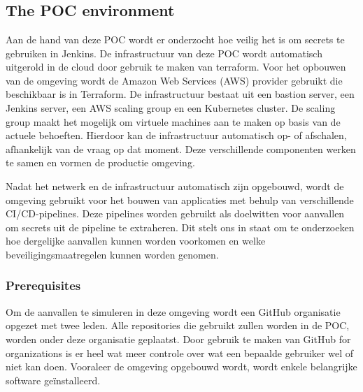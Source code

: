 
\chapter{}%
\label{ch:proof of concept}

\section{
{The POC environment}}
\label{sec:De POC omgeving}

Aan de hand van deze POC wordt er onderzocht hoe veilig het is om secrets te gebruiken in Jenkins. De infrastructuur van deze POC wordt automatisch uitgerold in de cloud door gebruik te maken van terraform. Voor het opbouwen van de omgeving wordt de Amazon Web Services (AWS) provider gebruikt die beschikbaar is in Terraform. De infrastructuur bestaat uit een bastion server, een Jenkins server, een AWS scaling group en een Kubernetes cluster. De scaling group maakt het mogelijk om virtuele machines aan te maken op basis van de actuele behoeften. Hierdoor kan de infrastructuur automatisch op- of afschalen, afhankelijk van de vraag op dat moment. Deze verschillende componenten werken te samen en vormen de productie omgeving.
\newline 

Nadat het netwerk en de infrastructuur automatisch zijn opgebouwd, wordt de omgeving gebruikt voor het bouwen van applicaties met behulp van verschillende CI/CD-pipelines. Deze pipelines worden gebruikt als doelwitten voor aanvallen om secrets uit de pipeline te extraheren. Dit stelt ons in staat om te onderzoeken hoe dergelijke aanvallen kunnen worden voorkomen en welke beveiligingsmaatregelen kunnen worden genomen.

\subsection{
{Prerequisites}}
\label{sec:Prerequisites}

Om de aanvallen te simuleren in deze omgeving wordt een GitHub organisatie opgezet met twee leden. Alle repositories die gebruikt zullen worden in de POC, worden onder deze organisatie geplaatst. Door gebruik te maken van GitHub for organizations is er heel wat meer controle over wat een bepaalde gebruiker wel of niet kan doen. Vooraleer de omgeving opgebouwd wordt, wordt enkele belangrijke software geïnstalleerd.
\newline 

